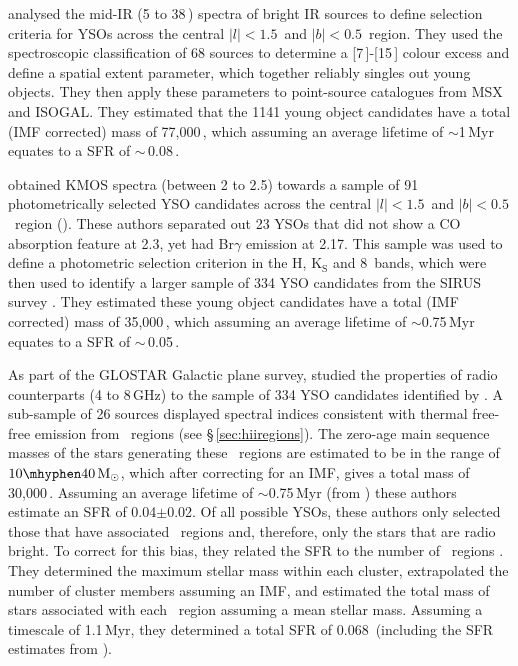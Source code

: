 \citet{Immer2012b} analysed the mid-IR (5 to 38\,\micron) spectra of bright IR sources to define selection criteria for YSOs across the central $|l|<1.5$\degree\ and $|b|<0.5$\degree\ region. 
They used the spectroscopic classification of 68 sources to determine a [7\,\micron]-[15\,\micron] colour excess and define a spatial extent parameter, which together reliably singles out young objects. 
They then apply these parameters to point-source catalogues from MSX and ISOGAL. 
They estimated that the 1141 young object candidates have a total (IMF corrected) mass of 77,000\,\msun, which assuming an average lifetime of $\sim$1\,Myr equates to a SFR of $\sim$\,0.08\,\msunyr. 

\citet{Nandakumar2018} obtained KMOS spectra (between 2 to 2.5\micron) towards a sample of 91 photometrically selected YSO candidates across the central $|l|<1.5$\degree\ and $|b|<0.5$\degree\ region (\citealp{Nishiyama2006, Ramirez2008}). 
These authors separated out 23 YSOs that did not show a CO absorption feature at 2.3\micron, yet had Br$\gamma$ emission at 2.17\micron. 
This sample was used to define a photometric selection criterion in the H, K$_\mathrm{S}$ and 8\micron\ bands, which were then used to identify a larger sample of 334 YSO candidates from the SIRUS survey \citep{Nishiyama2006}. 
They estimated these young object candidates have a total (IMF corrected) mass of 35,000\,\msun, which assuming an average lifetime of $\sim$0.75\,Myr equates to a SFR of $\sim$\,0.05\,\msunyr. 

As part of the GLOSTAR Galactic plane survey, \citet{Nguyen2021} studied the properties of radio counterparts (4 to 8\,GHz) to the sample of 334 YSO candidates identified by \citet{Nandakumar2018}. 
A sub-sample of 26 sources displayed spectral indices consistent with thermal free-free emission from \hii\ regions (see \S\,\ref{sec:hiiregions}). 
The zero-age main sequence masses of the stars generating these \hii\ regions are estimated to be in the range of $10 \mhyphen 40\,\msun$, which after correcting for an IMF, gives a total mass of 30,000\,\msun. 
Assuming an average lifetime of $\sim$0.75\,Myr (from \citealp{Nandakumar2018}) these authors estimate an SFR of 0.04$\pm$0.02\msunyr. 
Of all possible YSOs, these authors only selected those that have associated \hii\ regions and, therefore, only the stars that are radio bright. 
To correct for this bias, they related the SFR to the number of \hii\ regions \citep[following][]{Kauffmann2017b}. 
They determined the maximum stellar mass within each cluster, extrapolated the number of cluster members assuming an IMF, and estimated the total mass of stars associated with each \hii\ region assuming a mean stellar mass. 
Assuming a timescale of 1.1\,Myr, they determined a total SFR of 0.068\msunyr \ (including the SFR estimates from \citealp{Kauffmann2017b}).

